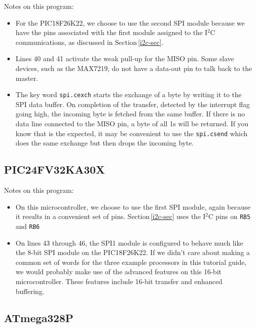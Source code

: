 \documentclass[12pt,a4paper]{article}
\newcommand{\code}[2]{
 \hrulefill
 \scriptsize
 
 \hrulefill
 \vspace{2em}
 \normalsize
}
\begin{document}
\medskip\noindent
\code{}{../pic18/spi2-base-k22.txt}

\noindent
Notes on this program:
\begin{itemize}
  \item For the PIC18F26K22, we choose to use the second SPI module 
    because we have the pins associated with the first module assigned to the I$^2$C communications,
    as discussed in Section\,\ref{i2c-sec}.
  \item Lines 40 and 41 activate the weak pull-up for the MISO pin.
    Some slave devices, such as the MAX7219, do not have a data-out pin to talk back to the master.
  \item The key word \verb!spi.cexch! starts the exchange of a byte by writing it to the SPI data buffer.
    On completion of the transfer, detected by the interrupt flag going high,
    the incoming byte is fetched from the same buffer.
    If there is no data line connected to the MISO pin, a byte of all 1s will be returned.
    If you know that is the expected, it may be convenient to use the \verb!spi.csend! which
    does the same exchange but then drops the incoming byte.
\end{itemize}

\subsection{PIC24FV32KA30X}
\code{}{../pic24/spi1-base-pic24fv32ka302.txt}

\noindent
Notes on this program:
\begin{itemize}
  \item On this microcontroller, we choose to use the first SPI module, again because
    it results in a convenient set of pins.
    Section\,\ref{i2c-sec} uses the I$^2$C pins on \verb!RB5! and \verb!RB6!
  \item On lines 43 through 46, the SPI1 module is configured to behave much like the 
    8-bit SPI module on the PIC18F26K22.
    If we didn't care about making a common set of words for the three example processors
    in this tutorial guide, 
    we would probably make use of the advanced features on this 16-bit microcontroller.
    These features include 16-bit transfer and enhanced buffering.
\end{itemize}

\subsection{ATmega328P}
\code{}{../avr8-2016/spi-base-avr.txt}
\end{document}
